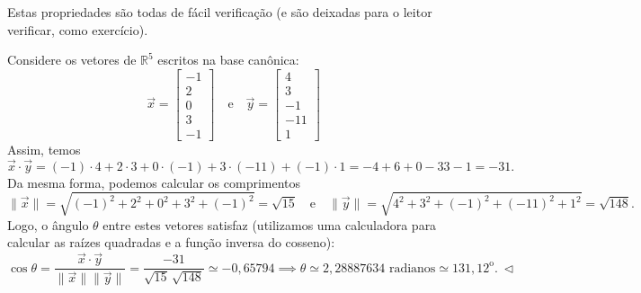 Estas propriedades são todas de fácil verificação (e são deixadas para o leitor verificar, como exercício).

\begin{ex}
	Considere os vetores de $\mathbb{R}^5$ escritos na base canônica:
	\begin{equation}
	\vec{x} =
	\begin{bmatrix}
	-1 \\ 2 \\ 0 \\ 3 \\ -1
	\end{bmatrix} \quad \text{e} \quad \vec{y} =
	\begin{bmatrix}
	4 \\ 3 \\ -1 \\ -11 \\ 1
	\end{bmatrix}
	\end{equation} Assim, temos
	\begin{equation}
	\vec{x} \cdot \vec{y} = (-1)\cdot 4 + 2 \cdot 3 + 0 \cdot (-1) +3 \cdot(-11) + (-1)\cdot 1 = -4 + 6 +0 -33 -1 = -31.
	\end{equation} Da mesma forma, podemos calcular os comprimentos
	\begin{equation}
	\| \vec{x} \| = \sqrt{(-1)^2 + 2^2 + 0^2 + 3^2 + (-1)^2} = \sqrt{15} \quad \text{e} \quad \| \vec{y} \| = \sqrt{4^2 + 3^2 + (-1)^2 + (-11)^2 + 1^2} = \sqrt{148}.
	\end{equation} Logo, o ângulo $\theta$ entre estes vetores satisfaz (utilizamos uma calculadora para calcular as raízes quadradas e a função inversa do cosseno):
	\begin{equation}
	\cos \theta = \frac{\vec{x} \cdot \vec{y}}{\|\vec{x}\| \|\vec{y}\|} = \frac{-31}{\sqrt{15} \, \sqrt{148}} \simeq -0,65794 \implies  \theta \simeq 2,28887634 \textrm{ radianos} \simeq 131,12^{\text{o}}. \ \lhd
	\end{equation}
\end{ex}

